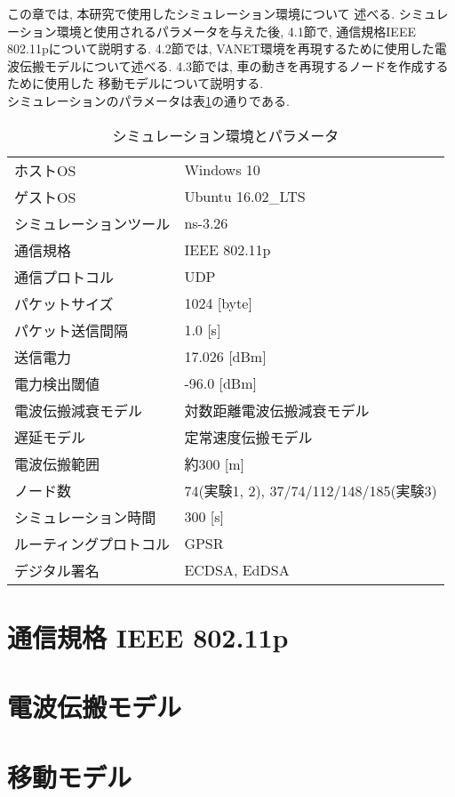 この章では, 本研究で使用したシミュレーション環境について
述べる. シミュレーション環境と使用されるパラメータを与えた後, 
4.1節で, 通信規格IEEE 802.11pについて説明する. 4.2節では, 
VANET環境を再現するために使用した電波伝搬モデルについて述べる. 
4.3節では, 車の動きを再現するノードを作成するために使用した
移動モデルについて説明する.\\
\indent シミュレーションのパラメータは表\ref{tab:simulation_parameter}の通りである. 
\setlength{\tabcolsep}{30pt}
\begin{longtable}{ll}
  \caption{シミュレーション環境とパラメータ}
  \label{tab:simulation_parameter}
  \endfirsthead
  \hline
  ホストOS & Windows 10\\
  ゲストOS & Ubuntu 16.02\_LTS\\
  シミュレーションツール & ns-3.26 \\
  通信規格 & IEEE 802.11p \\
  通信プロトコル & UDP \\
  パケットサイズ & 1024 [byte] \\
  パケット送信間隔 & 1.0 [s] \\
  送信電力 & 17.026 [dBm] \\
  電力検出閾値 & -96.0 [dBm] \\
  電波伝搬減衰モデル & 対数距離電波伝搬減衰モデル \\
  遅延モデル & 定常速度伝搬モデル \\
  電波伝搬範囲 & 約300 [m] \\
  ノード数 & 74(実験1, 2), 37/74/112/148/185(実験3) \\
  シミュレーション時間 & 300 [s] \\
  ルーティングプロトコル & GPSR \\
  デジタル署名 & ECDSA, EdDSA \\ \hline
\end{longtable}
\vspace{3em}


\section{通信規格 IEEE 802.11p}

\section{電波伝搬モデル}


\section{移動モデル}

